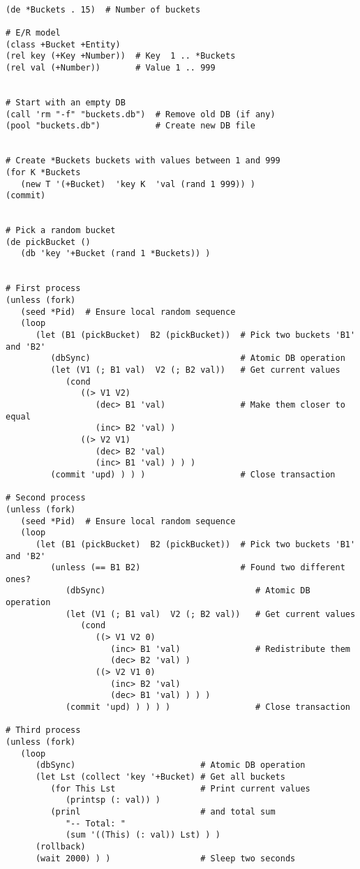 \begin{verbatim}

(de *Buckets . 15)  # Number of buckets

# E/R model
(class +Bucket +Entity)
(rel key (+Key +Number))  # Key  1 .. *Buckets
(rel val (+Number))       # Value 1 .. 999


# Start with an empty DB
(call 'rm "-f" "buckets.db")  # Remove old DB (if any)
(pool "buckets.db")           # Create new DB file


# Create *Buckets buckets with values between 1 and 999
(for K *Buckets
   (new T '(+Bucket)  'key K  'val (rand 1 999)) )
(commit)


# Pick a random bucket
(de pickBucket ()
   (db 'key '+Bucket (rand 1 *Buckets)) )


# First process
(unless (fork)
   (seed *Pid)  # Ensure local random sequence
   (loop
      (let (B1 (pickBucket)  B2 (pickBucket))  # Pick two buckets 'B1' and 'B2'
         (dbSync)                              # Atomic DB operation
         (let (V1 (; B1 val)  V2 (; B2 val))   # Get current values
            (cond
               ((> V1 V2)
                  (dec> B1 'val)               # Make them closer to equal
                  (inc> B2 'val) )
               ((> V2 V1)
                  (dec> B2 'val)
                  (inc> B1 'val) ) ) )
         (commit 'upd) ) ) )                   # Close transaction

# Second process
(unless (fork)
   (seed *Pid)  # Ensure local random sequence
   (loop
      (let (B1 (pickBucket)  B2 (pickBucket))  # Pick two buckets 'B1' and 'B2'
         (unless (== B1 B2)                    # Found two different ones?
            (dbSync)                              # Atomic DB operation
            (let (V1 (; B1 val)  V2 (; B2 val))   # Get current values
               (cond
                  ((> V1 V2 0)
                     (inc> B1 'val)               # Redistribute them
                     (dec> B2 'val) )
                  ((> V2 V1 0)
                     (inc> B2 'val)
                     (dec> B1 'val) ) ) )
            (commit 'upd) ) ) ) )                 # Close transaction

# Third process
(unless (fork)
   (loop
      (dbSync)                         # Atomic DB operation
      (let Lst (collect 'key '+Bucket) # Get all buckets
         (for This Lst                 # Print current values
            (printsp (: val)) )
         (prinl                        # and total sum
            "-- Total: "
            (sum '((This) (: val)) Lst) ) )
      (rollback)
      (wait 2000) ) )                  # Sleep two seconds


\end{verbatim}
